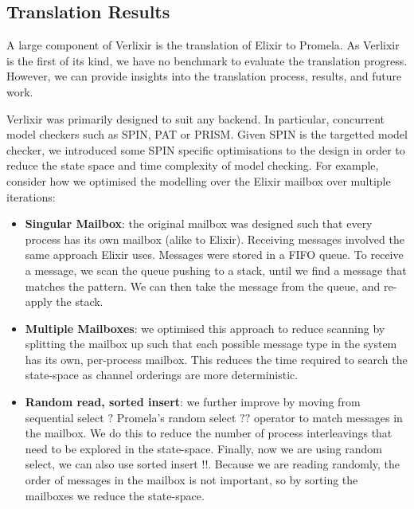 \subsection{Translation Results}
A large component of Verlixir is the translation of Elixir to Promela. As Verlixir is the first of its kind, we have no benchmark to evaluate the translation progress. However, we can provide insights into the translation process, results, and future work.
\par
Verlixir was primarily designed to suit any backend. In particular, concurrent model checkers such as SPIN, PAT or PRISM. Given SPIN is the targetted model checker, we introduced some SPIN specific optimisations to the design in order to reduce the state space and time complexity of model checking. For example, consider how we optimised the modelling over the Elixir mailbox over multiple iterations:
\begin{itemize}
    \item \textbf{Singular Mailbox}: the original mailbox was designed such that every process has its own mailbox (alike to Elixir). Receiving messages involved the same approach Elixir uses. Messages were stored in a FIFO queue. To receive a message, we scan the queue pushing to a stack, until we find a message that matches the pattern. We can then take the message from the queue, and re-apply the stack. 
    \item \textbf{Multiple Mailboxes}: we optimised this approach to reduce scanning by splitting the mailbox up such that each possible message type in the system has its own, per-process mailbox. This reduces the time required to search the state-space as channel orderings are more deterministic. 
    \item \textbf{Random read, sorted insert}: we further improve by moving from sequential select $?$ Promela's random select $??$ operator to match messages in the mailbox. We do this to reduce the number of process interleavings that need to be explored in the state-space. Finally, now we are using random select, we can also use sorted insert $!!$. Because we are reading randomly, the order of messages in the mailbox is not important, so by sorting the mailboxes we reduce the state-space. 
\end{itemize}
